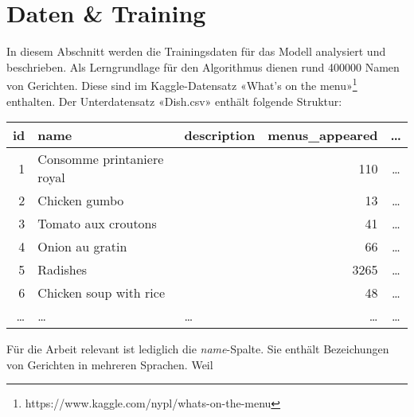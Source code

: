 \section{Daten \& Training}
\label{sec:model-data-training}

In diesem Abschnitt werden die Trainingsdaten für das Modell analysiert und beschrieben.
Als Lerngrundlage für den Algorithmus dienen rund 400000 Namen von Gerichten.
Diese sind im Kaggle-Datensatz «What's on the menu»\footnote{https://www.kaggle.com/nypl/whats-on-the-menu} enthalten.
Der Unterdatensatz «Dish.csv» enthält folgende Struktur:

\begin{center}
    \begin{tabular}{ |r|l|l|r|c| }
        \hline
        id & name & description & menus\_appeared & … \\
        \hline
        1 & Consomme printaniere royal & & 110 & … \\
        \hline
        2 & Chicken gumbo & & 13 & … \\
        \hline
        3 & Tomato aux croutons & & 41 & … \\
        \hline
        4 & Onion au gratin & & 66 & … \\
        \hline
        5 & Radishes & & 3265 & … \\
        \hline
        6 & Chicken soup with rice & & 48 & … \\
        \hline
        … & … & … & … & … \\
        \hline
    \end{tabular}
\end{center}

Für die Arbeit relevant ist lediglich die \textit{name}-Spalte.
Sie enthält Bezeichungen von Gerichten in mehreren Sprachen.
Weil